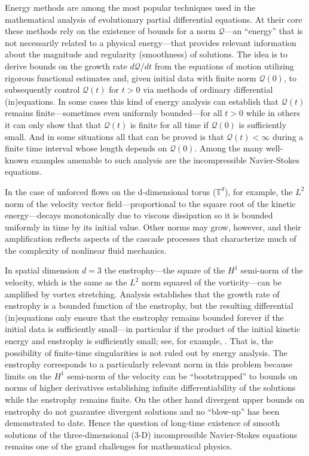 \documentclass[11pt]{article}
\def\Q{{\mathcal{Q}}}
\def\Q{{\mathcal{Q}}}
\begin{document}
Energy methods are among the most popular techniques used in the mathematical analysis of evolutionary partial differential equations.
At their core these methods rely on the existence of bounds for a norm $\Q$---an ``energy'' that is not necessarily related to a physical energy---that provides relevant information about the magnitude and regularity (smoothness) of solutions.
The idea is to derive bounds on the growth rate $d\Q/dt$ from the equations of motion utilizing rigorous functional estimates and, given initial data with finite norm $\Q(0)$, to subsequently control $\Q(t)$ for $t>0$ via methods of ordinary differential (in)equations.
In some cases this kind of energy analysis can establish that $\Q(t)$ remains finite---sometimes even uniformly bounded---for all $t>0$ while in others it can only show that that $\Q(t)$ is finite for all time if $\Q(0)$ is sufficiently small.
And in some situations all that can be proved is that $\Q(t) < \infty$ during a finite time interval whose length depends on $\Q(0)$.
Among the many well-known examples amenable to such analysis are the incompressible Navier-Stokes equations.

In the case of unforced flows on the d-dimensional torus ($\mathbb{T}^d$), for example, the $L^2$ norm of the velocity vector field---proportional to the square root of the kinetic energy---decays monotonically due to viscous dissipation so it is bounded uniformly in time by its initial value.
Other norms may grow, however, and their amplification reflects aspects of the cascade processes that characterize much of the complexity of nonlinear fluid mechanics.

In spatial dimension $d = 3$ the enstrophy---the square of the $H^1$ semi-norm of the velocity, which is the same as the $L^2$ norm squared of the vorticity---can be amplified by vortex stretching.
Analysis establishes that the growth rate of enstrophy is a bounded function of the enstrophy, but the resulting differential (in)equations only ensure that the enstrophy remains bounded forever if the initial data is sufficiently small---in particular if the product of the initial kinetic energy and enstrophy is sufficiently small; see, for example, \cite{d09}.
That is, the possibility of finite-time singularities is not ruled out by energy analysis.
The enstrophy corresponds to a particularly relevant norm in this problem because limits on the $H^1$ semi-norm of the velocity can be ``bootstrapped'' to bounds on norms of higher derivatives establishing infinite differentiability of the solutions while the enstrophy remains finite.
On the other hand divergent upper bounds on enstrophy do not guarantee divergent solutions and no ``blow-up'' has been demonstrated to date.
Hence the question of long-time existence of smooth solutions of the three-dimensional (3-D) incompressible Navier-Stokes equations remains one of the grand challenges for mathematical physics.
\end{document}
